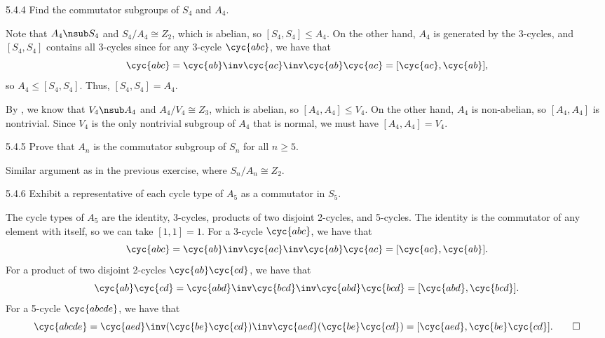 \begin{exercise}{5.4.4}
    Find the commutator subgroups of $S_4$ and $A_4$.
\end{exercise}

\begin{sol}
    Note that $A_4 \nsub S_4$ and $S_4/A_4 \cong Z_2$, which is abelian, so $[S_4, S_4] \leq A_4$.
	On the other hand, $A_4$ is generated by the 3-cycles, and $[S_4, S_4]$ contains all 3-cycles since for any 3-cycle $\cyc{a b c}$, we have that
    \[
    	\cyc{a b c} = \cyc{a b}\inv \cyc{a c}\inv \cyc{a b} \cyc{a c} = [\cyc{a c}, \cyc{a b}],
    \]
    so $A_4 \leq [S_4, S_4]$.
	Thus, $[S_4, S_4] = A_4$. 

    By , we know that $V_4 \nsub A_4$ and $A_4/V_4 \cong Z_3$, which is abelian, so $[A_4, A_4] \leq V_4$.
	On the other hand, $A_4$ is non-abelian, so $[A_4, A_4]$ is nontrivial.
	Since $V_4$ is the only nontrivial subgroup of $A_4$ that is normal, we must have $[A_4, A_4] = V_4$. \qedhere
\end{sol}

\begin{exercise}{5.4.5}
    Prove that $A_n$ is the commutator subgroup of $S_n$ for all $n \geq 5$.
\end{exercise}

\begin{sol}
    Similar argument as in the previous exercise, where $S_n/A_n \cong Z_2$.
\end{sol}

\begin{exercise}{5.4.6}
    Exhibit a representative of each cycle type of $A_5$ as a commutator in $S_5$.
\end{exercise}

\begin{sol}
    The cycle types of $A_5$ are the identity, 3-cycles, products of two disjoint 2-cycles, and 5-cycles.
	The identity is the commutator of any element with itself, so we can take $[1, 1] = 1$.
	For a 3-cycle $\cyc{a b c}$, we have that
    \[
    	\cyc{a b c} = \cyc{a b}\inv \cyc{a c}\inv \cyc{a b} \cyc{a c} = [\cyc{a c}, \cyc{a b}].
    \]
    For a product of two disjoint 2-cycles $\cyc{a b}\cyc{c d}$, we have that
    \[
    	\cyc{a b}\cyc{c d} = \cyc{a b d}\inv \cyc{b c d}\inv \cyc{a b d} \cyc{b c d} = [\cyc{a b d}, \cyc{b c d}].
    \]
    For a 5-cycle $\cyc{a b c d e}$, we have that
    \[
    	\cyc{a b c d e} = \cyc{a e d}\inv (\cyc{b e}\cyc{c d})\inv \cyc{a e d} (\cyc{b e}\cyc{c d}) = [\cyc{a e d}, \cyc{b e}\cyc{c d}]. \qedhere
    \]
\end{sol}

